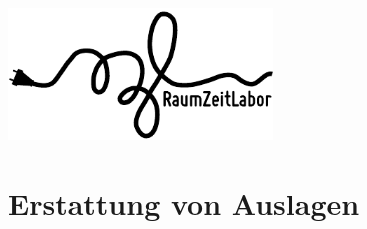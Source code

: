 \documentclass[ngerman,a4wide]{scrartcl}
\begin{document}
\begin{floatingfigure}{0.45\textwidth}
    \vspace{3.5cm}
    \includegraphics[width=7cm]{RaumZeitLabor_Logo_Schwarz.pdf} %
\end{floatingfigure}
\section*{Erstattung von Auslagen}
\end{document}
